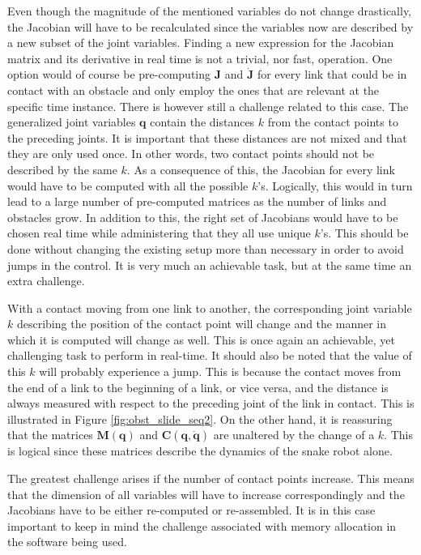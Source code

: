 Even though the magnitude of the mentioned variables do not change drastically, the Jacobian will have to be recalculated since the variables now are described by a new subset of the joint variables. Finding a new expression for the Jacobian matrix and its derivative in real time is not a trivial, nor fast, operation. One option would of course be pre-computing $\mathbf{J}$ and $\dot{\mathbf{J}}$ for every link that could be in contact with an obstacle and only employ the ones that are relevant at the specific time instance. There is however still a challenge related to this case. The generalized joint variables $\mathbf{q}$ contain the distances $k$ from the contact points to the preceding joints. It is important that these distances are not mixed and that they are only used once. In other words, two contact points should not be described by the same $k$. As a consequence of this, the Jacobian for every link would have to be computed with all the possible $k$'s. Logically, this would in turn lead to a large number of pre-computed matrices as the number of links and obstacles grow. In addition to this, the right set of Jacobians would have to be chosen real time while administering that they all use unique $k$'s. This should be done without changing the existing setup more than necessary in order to avoid jumps in the control. It is very much an achievable task, but at the same time an extra challenge.

With a contact moving from one link to another, the corresponding joint variable $k$ describing the position of the contact point will change and the manner in which it is computed will change as well. This is once again an achievable, yet challenging task to perform in real-time. It should also be noted that the value of this $k$ will probably experience a jump. This is because the contact moves from the end of a link to the beginning of a link, or vice versa, and the distance is always measured with respect to the preceding joint of the link in contact. This is illustrated in Figure \ref{fig:obst_slide_seq2}. On the other hand, it is reassuring that the matrices $\mathbf{M(q)}$ and $\mathbf{C(q,\dot{q})}$ are unaltered by the change of a $k$. This is logical since these matrices describe the dynamics of the snake robot alone.

The greatest challenge arises if the number of contact points increase. This means that the dimension of all variables will have to increase correspondingly and the Jacobians have to be either re-computed or re-assembled. It is in this case important to keep in mind the challenge associated with memory allocation in the software being used.

